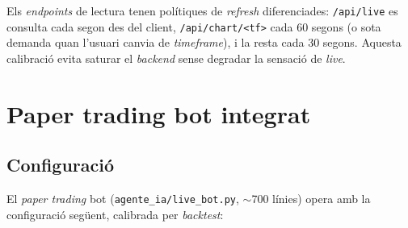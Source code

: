 \documentclass[12pt, a4paper]{report}
\begin{document}
Els \textit{endpoints} de lectura tenen polítiques de \textit{refresh} diferenciades: \texttt{/api/live} es consulta cada segon des del client, \texttt{/api/chart/<tf>} cada 60 segons (o sota demanda quan l'usuari canvia de \textit{timeframe}), i la resta cada 30 segons. Aquesta calibració evita saturar el \textit{backend} sense degradar la sensació de \textit{live}.

\section{Paper trading bot integrat}

\subsection{Configuració}

El \textit{paper trading} bot (\texttt{agente\_ia/live\_bot.py}, $\sim$700 línies) opera amb la configuració següent, calibrada per \textit{backtest}:
\end{document}
